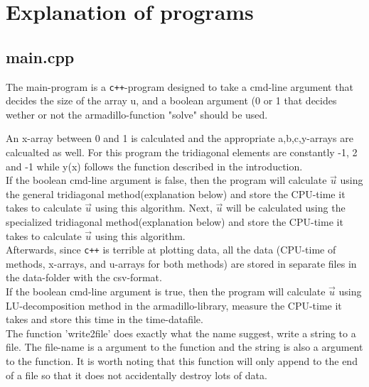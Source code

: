 \documentclass[11pt,a4paper,notitlepage]{article}
\begin{document}
\section{Explanation of programs}
\subsection{main.cpp}
	The main-program is a \verb|c++|-program designed to take a cmd-line argument that decides the size of the array u, and a boolean argument (0 or 1 that decides wether or not the armadillo-function "solve" should be used.
	
	An x-array between 0 and 1 is calculated and the appropriate a,b,c,y-arrays are calcualted as well. For this program the tridiagonal elements are constantly -1, 2 and -1 while y(x) follows the function described in the introduction. \\
	
	If the boolean cmd-line argument is false, then the program will calculate $\vec{u}$ using the general tridiagonal method(explanation below) and store the CPU-time it takes to calculate $\vec{u}$ using this algorithm.
	Next, $\vec{u}$ will be calculated using the specialized tridiagonal method(explanation below) and store the CPU-time it takes to calculate $\vec{u}$ using this algorithm. \\
	Afterwards, since \verb|c++| is terrible at plotting data, all the data (CPU-time of methods, x-arrays, and u-arrays for both methods) are stored in separate files in the data-folder with the csv-format. \\
	
	If the boolean cmd-line argument is true, then the program will calculate $\vec{u}$ using LU-decomposition method in the armadillo-library, measure the CPU-time it takes and store this time in the time-datafile. \\
	
	The function 'write2file' does exactly what the name suggest, 
	write a string to a file. The file-name is a argument to the function and the string is also a argument to the function. 
	It is worth noting that this function will only append to the end of a file so that it does not accidentally destroy lots of data.\\
\end{document}
